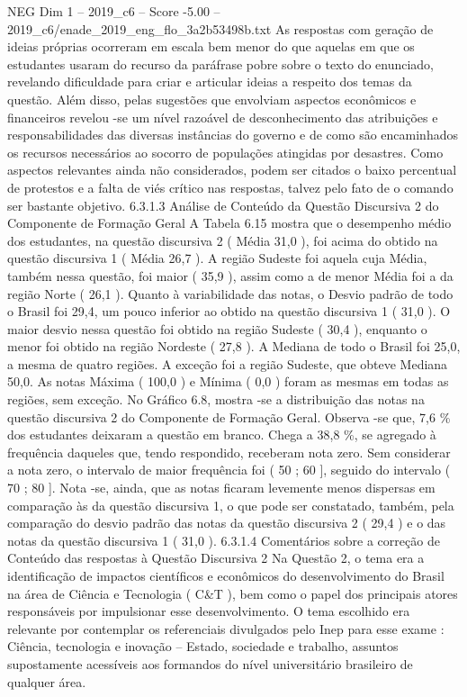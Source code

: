 \begin{textsample}{NEG Dim 1 – 2019\_c6 – Score -5.00 – 2019\_c6/enade\_2019\_eng\_flo\_3a2b53498b.txt}
As respostas com geração de ideias próprias ocorreram em escala bem menor do que aquelas em que os estudantes usaram do recurso da paráfrase pobre sobre o texto do enunciado, revelando dificuldade para criar e articular ideias a respeito dos temas da questão.
Além disso, pelas sugestões que envolviam aspectos econômicos e financeiros revelou -se um nível razoável de desconhecimento das atribuições e responsabilidades das diversas instâncias do governo e de como são encaminhados os recursos necessários ao socorro de populações atingidas por desastres.
Como aspectos relevantes ainda não considerados, podem ser citados o baixo percentual de protestos e a falta de viés crítico nas respostas, talvez pelo fato de o comando ser bastante objetivo. 6.3.1.3 Análise de Conteúdo da Questão Discursiva 2 do Componente de Formação Geral A Tabela 6.15 mostra que o desempenho médio dos estudantes, na questão discursiva 2 ( Média 31,0 ), foi acima do obtido na questão discursiva 1 ( Média 26,7 ).
A região Sudeste foi aquela cuja Média, também nessa questão, foi maior ( 35,9 ), assim como a de menor Média foi a da região Norte ( 26,1 ).
Quanto à variabilidade das notas, o Desvio padrão de todo o Brasil foi 29,4, um pouco inferior ao obtido na questão discursiva 1 ( 31,0 ).
O maior desvio nessa questão foi obtido na região Sudeste ( 30,4 ), enquanto o menor foi obtido na região Nordeste ( 27,8 ).
A Mediana de todo o Brasil foi 25,0, a mesma de quatro regiões.
A exceção foi a região Sudeste, que obteve Mediana 50,0.
As notas Máxima ( 100,0 ) e Mínima ( 0,0 ) foram as mesmas em todas as regiões, sem exceção.
No Gráfico 6.8, mostra -se a distribuição das notas na questão discursiva 2 do Componente de Formação Geral.
Observa -se que, 7,6 \% dos estudantes deixaram a questão em branco.
Chega a 38,8 \%, se agregado à frequência daqueles que, tendo respondido, receberam nota zero.
Sem considerar a nota zero, o intervalo de maior frequência foi ( 50 ; 60 ], seguido do intervalo ( 70 ; 80 ].
Nota -se, ainda, que as notas ficaram levemente menos dispersas em comparação às da questão discursiva 1, o que pode ser constatado, também, pela comparação do desvio padrão das notas da questão discursiva 2 ( 29,4 ) e o das notas da questão discursiva 1 ( 31,0 ). 6.3.1.4 Comentários sobre a correção de Conteúdo das respostas à Questão Discursiva 2 Na Questão 2, o tema era a identificação de impactos científicos e econômicos do desenvolvimento do Brasil na área de Ciência e Tecnologia ( C\&T ), bem como o papel dos principais atores responsáveis por impulsionar esse desenvolvimento.
O tema escolhido era relevante por contemplar os referenciais divulgados pelo Inep para esse exame : Ciência, tecnologia e inovação – Estado, sociedade e trabalho, assuntos supostamente acessíveis aos formandos do nível universitário brasileiro de qualquer área.

\end{textsample}
